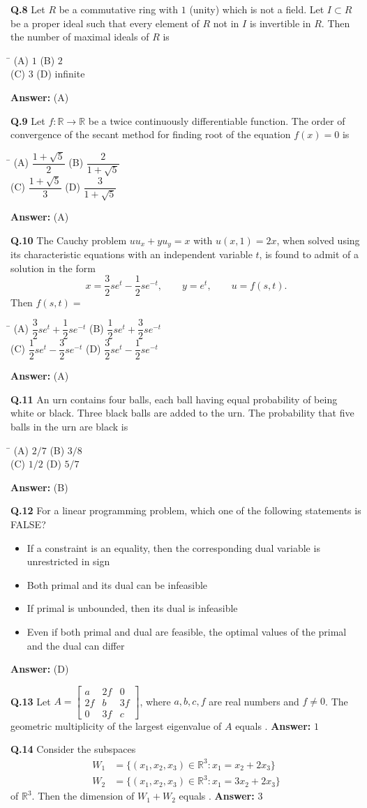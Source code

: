\documentclass[11pt,a4paper]{article}
\newcommand{\optsfourA}[4]{%
  \begin{tabbing}
    \hspace{0.48\linewidth}\=\kill
    (A) #1 \> (B) #2 \\[2pt]
    (C) #3 \> (D) #4
  \end{tabbing}%
}
\newcommand{\optslistA}[4]{%
  \begin{itemize}
    \setlength{\itemsep}{2pt}\setlength{\parskip}{0pt}
    \item[(A)] #1
    \item[(B)] #2
    \item[(C)] #3
    \item[(D)] #4
  \end{itemize}%
}
\newcommand{\ans}[1]{\textbf{Answer:} #1\par\medskip}
\begin{document}
\textbf{Q.8} Let $R$ be a commutative ring with $1$ (unity) which is not a field. Let $I \subset R$ be a proper ideal such that every element of $R$ not in $I$ is invertible in $R$. Then the number of maximal ideals of $R$ is
\optsfourA{$1$}{$2$}{$3$}{infinite}
\ans{(A)}

\textbf{Q.9} Let $f : \mathbb{R} \to \mathbb{R}$ be a twice continuously differentiable function. The order of convergence of the secant method for finding root of the equation $f(x) = 0$ is
\optsfourA{$\dfrac{1 + \sqrt{5}}{2}$}{$\dfrac{2}{1 + \sqrt{5}}$}{$\dfrac{1 + \sqrt{5}}{3}$}{$\dfrac{3}{1 + \sqrt{5}}$}
\ans{(A)}

\textbf{Q.10} The Cauchy problem $u u_x + y u_y = x$ with $u(x, 1) = 2x$, when solved using its characteristic equations with an independent variable $t$, is found to admit of a solution in the form
\[
  x = \frac{3}{2} s e^t - \frac{1}{2} s e^{-t}, \qquad y = e^t, \qquad u = f(s, t).
\]
Then $f(s, t) =$
\optsfourA{$\dfrac{3}{2} s e^t + \dfrac{1}{2} s e^{-t}$}{$\dfrac{1}{2} s e^t + \dfrac{3}{2} s e^{-t}$}{$\dfrac{1}{2} s e^t - \dfrac{3}{2} s e^{-t}$}{$\dfrac{3}{2} s e^t - \dfrac{1}{2} s e^{-t}$}
\ans{(A)}

\textbf{Q.11} An urn contains four balls, each ball having equal probability of being white or black. Three black balls are added to the urn. The probability that five balls in the urn are black is
\optsfourA{$2/7$}{$3/8$}{$1/2$}{$5/7$}
\ans{(B)}

\textbf{Q.12} For a linear programming problem, which one of the following statements is FALSE?
\optslistA{If a constraint is an equality, then the corresponding dual variable is unrestricted in sign}{Both primal and its dual can be infeasible}{If primal is unbounded, then its dual is infeasible}{Even if both primal and dual are feasible, the optimal values of the primal and the dual can differ}
\ans{(D)}

\textbf{Q.13} Let $A = \begin{bmatrix} a & 2f & 0 \\ 2f & b & 3f \\ 0 & 3f & c \end{bmatrix}$, where $a, b, c, f$ are real numbers and $f \neq 0$. The geometric multiplicity of the largest eigenvalue of $A$ equals \underline{\hspace{2cm}}.
\ans{$1$}

\textbf{Q.14} Consider the subspaces
\begin{align*}
  W_1 &= \{(x_1, x_2, x_3) \in \mathbb{R}^3 : x_1 = x_2 + 2x_3\} \\
  W_2 &= \{(x_1, x_2, x_3) \in \mathbb{R}^3 : x_1 = 3x_2 + 2x_3\}
\end{align*}
of $\mathbb{R}^3$. Then the dimension of $W_1 + W_2$ equals \underline{\hspace{2cm}}.
\ans{$3$}
\end{document}
